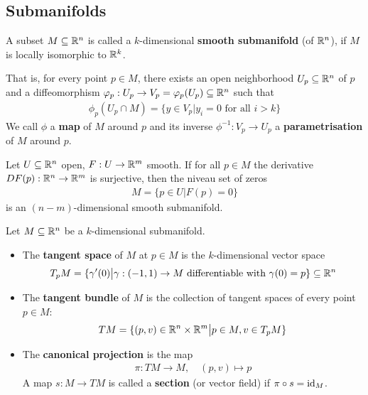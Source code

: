 \subsection{Submanifolds}

\begin{bdfn}[]
  A subset $M \subseteq \mathbb{R}^{n}$ is called a $k$-dimensional \textbf{smooth submanifold} (of $\mathbb{R}^{n}$), if $M$ is locally isomorphic to $\mathbb{R}^{k}$.

  That is, for every point $p \in M$, there exists an open neighborhood $U_p \subseteq \mathbb{R}^{n}$ of $p$ and a diffeomorphism $\varphi_p: U_p \to V_p = \varphi_p(U_p) \subseteq \mathbb{R}^{n}$ such that
  \begin{align*}
    \phi_p(U_p \cap M) = \{y \in V_p \big\vert y_i = 0 \text{ for all } i > k\}
  \end{align*}
  We call $\phi$ a \textbf{map} of $M$ around $p$ and its inverse $\phi^{-1}: V_p \to  U_p$ a \textbf{parametrisation} of $M$ around $p$.
\end{bdfn}


\begin{bthm}
Let $U \subseteq \mathbb{R}^{n}$ open, $F: U \to  \mathbb{R}^{m}$ smooth.
If for all $p \in M$ the derivative $DF(p): \mathbb{R}^{n} \to  \mathbb{R}^{m}$ is surjective, then the niveau set of zeros
\begin{align*}
  M = \{p \in U \big\vert F(p) = 0\}
\end{align*}
is an $(n-m)$-dimensional smooth submanifold.
\end{bthm}

\begin{bdfn}[]
Let $M \subseteq \mathbb{R}^{n}$ be a $k$-dimensional submanifold.
\begin{itemize}
  \item The \textbf{tangent space} of $M$ at $p \in M$ is the $k$-dimensional vector space
    \begin{align*}
      T_pM = \{\gamma'(0) \big\vert \gamma: (-1,1) \to  M \text{ differentiable with } \gamma(0) = p\} \subseteq \mathbb{R}^{n}
    \end{align*}
  \item The \textbf{tangent bundle} of $M$ is the collection of tangent spaces of every point $p \in M$:
    \begin{align*}
      TM = \{(p,v) \in \mathbb{R}^{n} \times \mathbb{R}^{m} \big\vert p \in M, v \in T_pM\}
    \end{align*}
  \item The \textbf{canonical projection} is the map
    \begin{align*}
      \pi: TM \to  M, \quad (p,v) \mapsto p
    \end{align*}
    A map $s: M \to  TM$ is called a \textbf{section} (or vector field) if $\pi \circ s = \operatorname{id}_M$.
    \begin{center}
    \end{center}
\end{itemize}
\end{bdfn}

